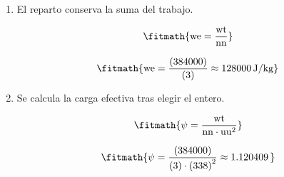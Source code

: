 \begin{enumerate}

\item El reparto conserva la suma del trabajo.

\[\fitmath{\mathrm{we}=\frac{\mathrm{wt}}{\mathrm{nn}}}\]

\[\fitmath{\mathrm{we}=\frac{(384000)}{(3)}\approx 128000\,\mathrm{J/kg}}\]

\item Se calcula la carga efectiva tras elegir el entero.

\[\fitmath{\psi=\frac{\mathrm{wt}}{\mathrm{nn}\cdot {\mathrm{uu}}^{2}}}\]

\[\fitmath{\psi=\frac{(384000)}{(3)\cdot {(338)}^{2}}\approx 1.120409\,}\]

\end{enumerate}

